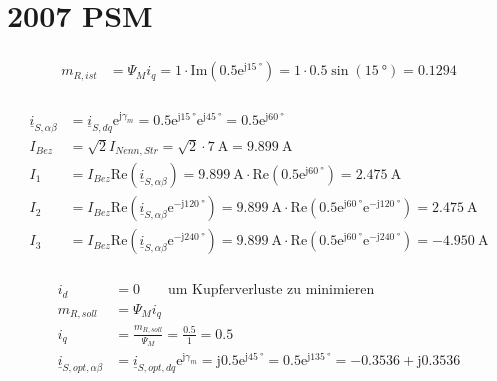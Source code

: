 \documentclass[11pt,a4paper]{scrartcl}
\newcommand{\mybr}[1]{\left(#1\right)}
\renewcommand{\j}{\mathrm{j}}
\renewcommand{\i}{\underline{i}}
\newcommand{\0}{_{\mybr{0}}}
\newcommand{\1}{_{\mybr{1}}}
\newcommand{\2}{_{\mybr{2}}}
\renewcommand{\e}{\mathrm{e}}
\renewcommand{\Re}{\mathrm{Re}}
\renewcommand{\Im}{\mathrm{Im}}
\newcommand{\isab}{\i_{S,\alpha\beta}}
\newcommand{\isdq}{\i_{S,dq}}
\begin{document}
\part{2007 PSM}
\section{}
\begin{align}
	m_{R,ist}&=\Psi_M i_q=1\cdot\Im\mybr{\num{0.5}\e^{\j\SI{15}{\degree}}}=1\cdot\num{0.5}\sin\mybr{\SI{15}{\degree}}=\num{0.1294}
\end{align}
\section{}
\begin{align}
	\isab&=\isdq\e^{\j\gamma_m}=\num{0.5}\e^{\j\SI{15}{\degree}}\e^{\j\SI{45}{\degree}}=\num{0.5}\e^{\j\SI{60}{\degree}}\\
	I_{Bez}&=\sqrt{2}I_{Nenn,Str}=\sqrt{2}\cdot\SI{7}{\ampere}=\SI{9.899}{\ampere}\\
	I_1&=I_{Bez}\Re\mybr{\isab}=\SI{9.899}{\ampere}\cdot\Re\mybr{\num{0.5}\e^{\j\SI{60}{\degree}}}=\SI{2.475}{\ampere}\\
	I_2&=I_{Bez}\Re\mybr{\isab\e^{-\j\SI{120}{\degree}}}=\SI{9.899}{\ampere}\cdot\Re\mybr{\num{0.5}\e^{\j\SI{60}{\degree}}\e^{-\j\SI{120}{\degree}}}=\SI{2.475}{\ampere}\\
	I_3&=I_{Bez}\Re\mybr{\isab\e^{-\j\SI{240}{\degree}}}=\SI{9.899}{\ampere}\cdot\Re\mybr{\num{0.5}\e^{\j\SI{60}{\degree}}\e^{-\j\SI{240}{\degree}}}=\SI{-4.950}{\ampere}
\end{align}

\section{}
\begin{align}
	i_d&=0\quad\quad\text{um Kupferverluste zu minimieren}\\
	m_{R,soll}&=\Psi_M i_q\\
	i_q&=\frac{m_{R,soll}}{\Psi_M}=\frac{\num{0.5}}{1}=\num{0.5}\\
	\i_{S,opt,\alpha\beta}&=\i_{S,opt,dq}\e^{\j\gamma_m}=\j\num{0.5}\e^{\j\SI{45}{\degree}}=\num{0.5}\e^{\j\SI{135}{\degree}}=-\num{0.3536}+\j\num{0.3536}
\end{align}
\end{document}
